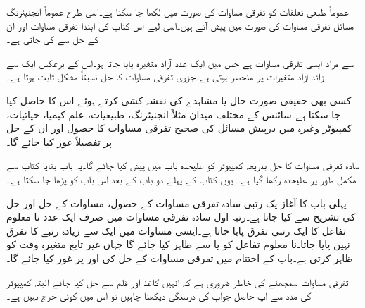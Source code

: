 عموماً طبعی تعلقات کو تفرقی مساوات کی صورت میں لکھا جا سکتا ہے۔اسی طرح عموماً انجنیئرنگ مسائل تفرقی مساوات کی صورت میں پیش آتے ہیں۔اسی لیے  اس کتاب کی ابتدا تفرقی مساوات اور ان کے حل سے کی جاتی ہے۔

 سے مراد ایسی تفرقی مساوات ہے جس میں ایک عدد آزاد متغیرہ پایا جاتا ہو۔اس کے برعکس  ایک سے زائد آزاد متغیرات پر منحصر ہوتی ہے۔جزوی تفرقی مساوات کا حل نسبتاً مشکل ثابت ہوتا ہے۔

کسی بھی حقیقی صورت حال یا مشاہدے کی نقشہ کشی کرتے ہوئے  اس کا  حاصل کیا جا سکتا ہے۔سائنس کے مختلف میدان مثلاً انجنیئرنگ، طبیعیات، علم کیمیا، حیاتیات، کمپیوٹر وغیرہ میں درپیش مسائل کی صحیح تفرقی مساوات کا حصول اور ان کے حل پر تفصیلاً غور کیا جائے گا۔

سادہ تفرقی مساوات کا حل بذریعہ کمپیوٹر کو علیحدہ باب میں  پیش کیا جائے گا۔یہ باب بقایا کتاب سے مکمل طور پر علیحدہ رکھا گیا ہے۔ یوں کتاب کے پہلے  دو باب کے بعد اس باب کو پڑھا جا سکتا ہے۔

پہلی باب کا آغاز  یک رتبی سادہ تفرقی مساوات کے حصول، مساوات کے حل اور حل کی تشریح  سے کیا جاتا ہے۔رتبہ اول سادہ تفرقی مساوات میں صرف ایک عدد نا معلوم تفاعل کا ایک رتبی تفرق پایا جاتا ہے۔ایسی مساوات میں ایک سے زیادہ رتبے کا تفرق نہیں پایا جاتا۔نا معلوم تفاعل کو  یا  سے ظاہر کیا جائے گا جہاں غیر تابع متغیرہ    وقت کو ظاہر کرتی ہے۔باب کے اختتام میں تفرقی مساوات کے حل کی   اور  پر غور کیا جائے گا۔

تفرقی مساوات سمجھنے کی خاطر ضروری ہے کہ انہیں کاغذ اور قلم سے حل کیا جائے البتہ کمپیوٹر کی مدد سے آپ حاصل جواب کی درستگی دیکھنا چاہیں تو اس میں کوئی حرج نہیں ہے۔

